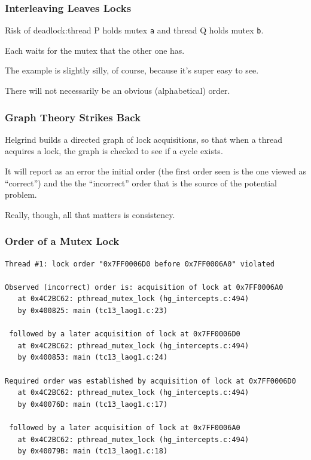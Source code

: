 \begin{frame}
	\frametitle{Interleaving Leaves Locks}

	Risk of deadlock:thread P holds mutex \texttt{a} and thread Q holds mutex \texttt{b}.

	Each waits for the mutex that the other one has.

	The example is slightly silly, of course, because it's super easy to see.

	There will not necessarily be an obvious (alphabetical) order.

\end{frame}

\begin{frame}
	\frametitle{Graph Theory Strikes Back}


	Helgrind builds a directed graph of lock acquisitions, so that when a thread acquires a lock, the graph is checked to see if a cycle exists.

	It will report as an error the initial order (the first order seen is the one viewed as ``correct'') and the the ``incorrect'' order that is the source of the potential problem.

	Really, though, all that matters is consistency.

\end{frame}

\begin{frame}[fragile]
	\frametitle{Order of a Mutex Lock}
	{\scriptsize
		\begin{verbatim}
Thread #1: lock order "0x7FF0006D0 before 0x7FF0006A0" violated

Observed (incorrect) order is: acquisition of lock at 0x7FF0006A0
   at 0x4C2BC62: pthread_mutex_lock (hg_intercepts.c:494)
   by 0x400825: main (tc13_laog1.c:23)

 followed by a later acquisition of lock at 0x7FF0006D0
   at 0x4C2BC62: pthread_mutex_lock (hg_intercepts.c:494)
   by 0x400853: main (tc13_laog1.c:24)

Required order was established by acquisition of lock at 0x7FF0006D0
   at 0x4C2BC62: pthread_mutex_lock (hg_intercepts.c:494)
   by 0x40076D: main (tc13_laog1.c:17)

 followed by a later acquisition of lock at 0x7FF0006A0
   at 0x4C2BC62: pthread_mutex_lock (hg_intercepts.c:494)
   by 0x40079B: main (tc13_laog1.c:18)
\end{verbatim}
	}

\end{frame}

